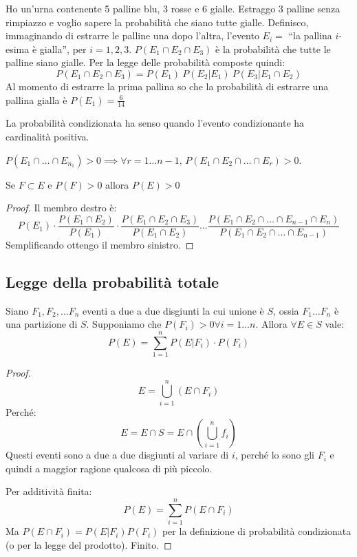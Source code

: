 \begin{exmp}
Ho un'urna contenente 5 palline blu, 3 rosse e 6 gialle. Estraggo 3 palline senza rimpiazzo e voglio sapere la probabilit\`a che siano tutte gialle. Definisco, immaginando di estrarre le palline una dopo l'altra, l'evento $E_i =$ ``la pallina $i$-esima \`e gialla'', per $i = 1, 2, 3$. $P(E_1 \cap E_2 \cap E_3)$ \`e la probabilit\`a che tutte le palline siano gialle. Per la legge delle probabilit\`a composte quindi:
\[
P(E_1 \cap E_2 \cap E_3) = 
P(E_1) \ P(E_2 | E_1) \ P(E_3 | E_1 \cap E_2)
\]
Al momento di estrarre la prima pallina so che la probabilit\`a di estrarre una pallina gialla \`e $P(E_1) = \frac{6}{14}$
\end{exmp}

La probabilit\`a condizionata ha senso quando l'evento condizionante ha cardinalit\`a positiva.

\begin{oss}
$P(E_1 \cap \ldots \cap E_{n_1}) > 0 \implies \forall r = 1 \dots n - 1 , \, P(E_1 \cap E_2 \cap \ldots \cap E_r) > 0$.
\end{oss}

Se $F \subset E$ e $P(F) > 0$ allora $P(E) > 0$

\begin{proof}
Il membro destro \`e:
\[
P(E_1) \cdot \frac{P(E_1 \cap E_2)}{P(E_1)} \cdot \frac{P(E_1 \cap E_2 \cap E_3)}{P(E_1 \cap E_2)} \dots \frac{P(E_1 \cap E_2 \cap \dots \cap E_{n-1} \cap E_n)}{P(E_1 \cap E_2 \cap \dots \cap E_{n-1})}
\]
Semplificando ottengo il membro sinistro.
\end{proof}

\subsection{Legge della probabilit\`a totale}
\begin{theorem}
Siano $F_1, F_2, \dots F_n$ eventi a due a due disgiunti la cui unione \`e $S$, ossia $F_1 \dots F_n$ \`e una partizione di $S$. Supponiamo che $P(F_i) > 0 \forall i = 1 \dots n$. Allora $\forall E \in S$ vale:
\[
P(E) = \sum_{1 = 1}^{n} P(E | F_i) \cdot P(F_i)
\]
\end{theorem}
\begin{proof}
\[
E = \bigcup_{i = 1}^{n} (E \cap F_i)
\]
Perch\'e:
\[
E = E \cap S = E \cap (\bigcup_{i = 1}^{n} f_i)
\]
Questi eventi sono a due a due disgiunti al variare di $i$, perch\'e lo sono gli $F_i$ e quindi a maggior ragione qualcosa di pi\`u piccolo.

Per additivit\`a finita:
\[
P(E) = \sum_{i = 1}^{n} P(E \cap F_i)
\]
Ma $P(E \cap F_i) = P(E | F_i) P(F_i)$ per la definizione di probabilit\`a condizionata (o per la legge del prodotto). Finito.
\end{proof}

